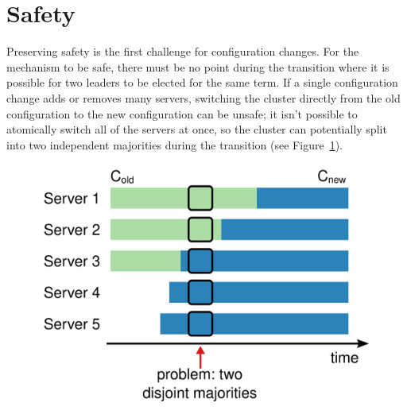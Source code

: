 \section{Safety}
\label{membership:safety}

Preserving safety is the first challenge for configuration changes.
For the mechanism to be safe,
there must be no point during the transition where it is possible for
two leaders to be elected for the same term. If a single configuration
change adds or removes many servers, switching the cluster directly from
the old configuration to the new configuration can be unsafe;
it isn't possible to atomically switch all of the servers at once, so 
the cluster can potentially split into two independent majorities
during the transition (see
Figure~\ref{fig:membership:reconfigurationdifficulty}).

\begin{figure}
\centering
\includegraphics[scale=.50]{membership/reconfigurationdifficulty}
\label{fig:membership:reconfigurationdifficulty}
\end{figure}

